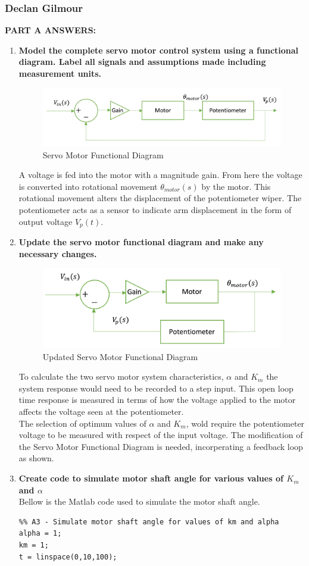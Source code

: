 \documentclass[11pt,a4paper]{article}
\begin{document}
\subsubsection{Declan Gilmour}
\textbf{PART A ANSWERS:}
\begin{enumerate}
	\item \textbf{Model the complete servo motor control system using a functional diagram. Label all signals and assumptions made including measurement units.}
	\begin{figure}[H]
	\centering
	\includegraphics[width=.8\textwidth]{PreDec/A1.png}
	\caption{\label{fig:rand}Servo Motor Functional Diagram}
	\end{figure} 
	A voltage is fed into the motor with a magnitude gain. From here the voltage is converted into rotational movement $\theta_{motor}(s)$ by the motor.
	This rotational movement alters the displacement of the potentiometer wiper. The potentiometer acts as a sensor to indicate arm displacement in the form of output voltage $V_p(t)$.
	\item\textbf{Update the servo motor functional diagram and make any necessary changes.}
	\begin{figure}[H]
	\centering
	\includegraphics[width=.8\textwidth]{PreDec/A2.png}
	\caption{\label{fig:rand}Updated Servo Motor Functional Diagram}
	\end{figure}
	To calculate the two servo motor system characteristics, $\alpha$ and $K_m$ the system response would need to be recorded to a step input. This open loop time response is measured in terms of how the voltage applied to the motor affects the voltage seen at the potentiometer.\\
	The selection of optimum values of $\alpha$ and $K_m$, wold require the potentiometer voltage to be measured with respect of the input voltage. The modification of the Servo Motor Functional Diagram is needed, incorperating a feedback loop as shown.  
\pagebreak
	\item\textbf{Create code to simulate motor shaft angle for various values of $K_m$ and $\alpha$}\\
	Bellow is the Matlab code used to simulate the motor shaft angle.
	\begin{lstlisting}
%% A3 - Simulate motor shaft angle for values of km and alpha
alpha = 1;
km = 1;
t = linspace(0,10,100);


\end{lstlisting}
\end{enumerate}
\end{document}
